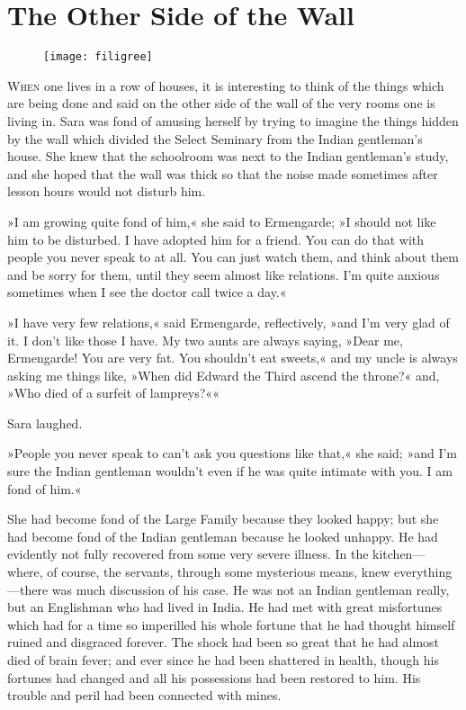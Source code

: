 \chapter{The Other Side of the Wall}

\begin{figure}[t!]
\centering
\texttt{[image: filigree]}
\end{figure}

\lettrine[lines=5]{W}{hen} one lives in a row of houses, it is interesting to think of the things which are being done and said on the other side of the wall of the very rooms one is living in. Sara was fond of amusing herself by trying to imagine the things hidden by the wall which divided the Select Seminary from the Indian gentleman's house. She knew that the schoolroom was next to the Indian gentleman's study, and she hoped that the wall was thick so that the noise made sometimes after lesson hours would not disturb him.

»I am growing quite fond of him,« she said to Ermengarde; »I should not like him to be disturbed. I have adopted him for a friend. You can do that with people you never speak to at all. You can just watch them, and think about them and be sorry for them, until they seem almost like relations. I'm quite anxious sometimes when I see the doctor call twice a day.«

»I have very few relations,« said Ermengarde, reflectively, »and I'm very glad of it. I don't like those I have. My two aunts are always saying, »Dear me, Ermengarde! You are very fat. You shouldn't eat sweets,« and my uncle is always asking me things like, »When did Edward the Third ascend the throne?« and, »Who died of a surfeit of lampreys?««

Sara laughed.

»People you never speak to can't ask you questions like that,« she said; »and I'm sure the Indian gentleman wouldn't even if he was quite intimate with you. I am fond of him.«

She had become fond of the Large Family because they looked happy; but she had become fond of the Indian gentleman because he looked unhappy. He had evidently not fully recovered from some very severe illness. In the kitchen—where, of course, the servants, through some mysterious means, knew everything—there was much discussion of his case. He was not an Indian gentleman really, but an Englishman who had lived in India. He had met with great misfortunes which had for a time so imperilled his whole fortune that he had thought himself ruined and disgraced forever. The shock had been so great that he had almost died of brain fever; and ever since he had been shattered in health, though his fortunes had changed and all his possessions had been restored to him. His trouble and peril had been connected with mines.


